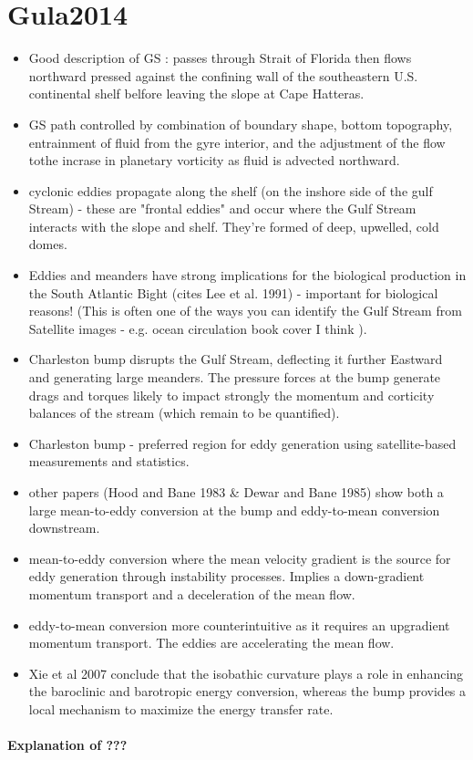 \documentclass[..\Papers.tex]{subfiles}
\begin{document}
\section{Gula2014}
\citep{Gula2014}


\begin{itemize}
    \item Good description of GS : passes through Strait of Florida then flows northward pressed against the confining wall of the southeastern U.S. continental shelf belfore leaving the slope at Cape Hatteras.
    \item GS path controlled by combination of boundary shape, bottom topography, entrainment of fluid from the gyre interior, and the adjustment of the flow tothe incrase in planetary vorticity as fluid is advected northward.
    \item cyclonic eddies propagate along the shelf (on the inshore side of the gulf Stream) - these are "frontal eddies" and occur where the Gulf Stream interacts with the slope and shelf. They're formed of deep, upwelled, cold domes.
    \item Eddies and meanders have strong implications for the biological production in the South Atlantic Bight (cites Lee et al. 1991) - important for biological reasons! (This is often one of the ways you can identify the Gulf Stream from Satellite images - e.g. ocean circulation book cover I think ).
    \item Charleston bump disrupts the Gulf Stream, deflecting it further Eastward and generating large meanders. The pressure forces at the bump generate drags and torques likely to impact strongly the momentum and corticity balances of the stream (which remain to be quantified).
    \item Charleston bump - preferred region for eddy generation using satellite-based measurements and statistics.
    \item other papers (Hood and Bane 1983 \& Dewar and Bane 1985) show both a large mean-to-eddy conversion at the bump and eddy-to-mean conversion downstream.
    \item mean-to-eddy conversion where the mean velocity gradient is the source for eddy generation through instability processes. Implies a down-gradient momentum transport and a deceleration of the mean flow.
    \item eddy-to-mean conversion more counterintuitive as it requires an upgradient momentum transport. The eddies are accelerating the mean flow.
    \item Xie et al 2007 conclude that the isobathic curvature plays a role in enhancing the baroclinic and barotropic energy conversion, whereas the bump provides a local mechanism to maximize the energy transfer rate. 
\end{itemize}

\paragraph{Explanation of ???}
\end{document}
